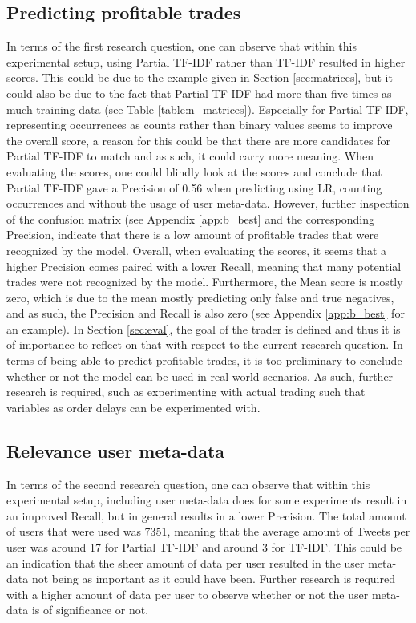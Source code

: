 \documentclass[sigconf]{acmart-txmm}
\begin{document}
\subsection{Predicting profitable trades}
In terms of the first research question, one can observe that within this experimental setup, using Partial TF-IDF rather than TF-IDF resulted in higher scores. This could be due to the example given in Section \ref{sec:matrices}, but it could also be due to the fact that Partial TF-IDF had more than five times as much training data (see Table \ref{table:n_matrices}). Especially for Partial TF-IDF, representing occurrences as counts rather than binary values seems to improve the overall score, a reason for this could be that there are more candidates for Partial TF-IDF to match and as such, it could carry more meaning.
When evaluating the scores, one could blindly look at the scores and conclude that Partial TF-IDF gave a Precision of 0.56 when predicting using LR, counting occurrences and without the usage of user meta-data. However, further inspection of the confusion matrix (see Appendix \ref{app:b_best} and the corresponding Precision, indicate that there is a low amount of profitable trades that were recognized by the model. Overall, when evaluating the scores, it seems that a higher Precision comes paired with a lower Recall, meaning that many potential trades were not recognized by the model. Furthermore, the Mean score is mostly zero, which is due to the mean mostly predicting only false and true negatives, and as such, the Precision and Recall is also zero (see Appendix \ref{app:b_best} for an example). 
In Section \ref{sec:eval}, the goal of the trader is defined and thus it is of importance to reflect on that with respect to the current research question. In terms of being able to predict profitable trades, it is too preliminary to conclude whether or not the model can be used in real world scenarios. As such, further research is required, such as experimenting with actual trading such that variables as order delays can be experimented with.

\subsection{Relevance user meta-data}
In terms of the second research question, one can observe that within this experimental setup, including user meta-data does for some experiments result in an improved Recall, but in general results in a lower Precision. The total amount of users that were used was 7351, meaning that the average amount of Tweets per user was around 17 for Partial TF-IDF and around 3 for TF-IDF. This could be an indication that the sheer amount of data per user resulted in the user meta-data not being as important as it could have been. Further research is required with a higher amount of data per user to observe whether or not the user meta-data is of significance or not.
\end{document}
